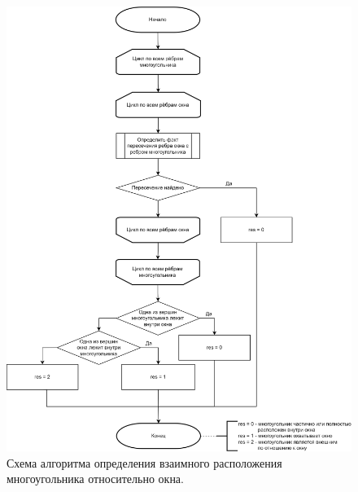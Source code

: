 \begin{figure}[h]
	\centering
	\includegraphics[width=\textwidth ]{img/flowchart/identification.png}
	\caption{Схема алгоритма определения взаимного расположения многоугольника относительно окна.}
	\label{fig:warnock_identification}
\end{figure} 

